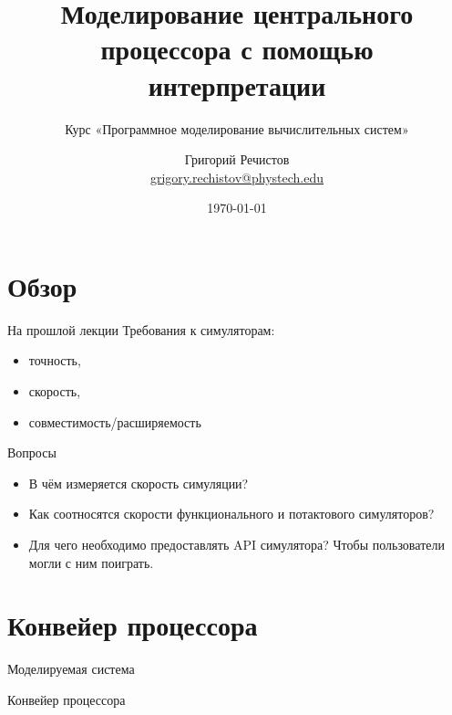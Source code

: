 \documentclass{beamer}
\title{Моделирование центрального процессора с помощью интерпретации}
\subtitle{Курс «Программное моделирование вычислительных систем»}
\author[]{Григорий Речистов \\ \small{\href{mailto:grigory.rechistov@phystech.edu}{grigory.rechistov@phystech.edu}}}
\date{\today}
\begin{document}
\begin{frame}
    \maketitle
\end{frame}

\begin{frame}
    \tableofcontents
\end{frame}

\section*{Обзор}

\begin{frame}{На прошлой лекции}
Требования к симуляторам:
\begin{itemize}
\item точность,
\item скорость,
\item совместимость/расширяемость
\end{itemize}

\end{frame}

\begin{frame}{Вопросы}
\begin{itemize}
\item В чём измеряется скорость симуляции? \pause
\item Как соотносятся скорости функционального и потактового симуляторов? \pause
\item Для чего необходимо предоставлять API симулятора? \pause Чтобы пользователи могли с ним поиграть.
\end{itemize}

\end{frame}



\section{Конвейер процессора}

\begin{frame}{Моделируемая система}
\centering
\vfill

\vfill
\end{frame}

\begin{frame}[shrink=0.8]{Конвейер процессора}
\centering

\end{frame}
\end{document}
